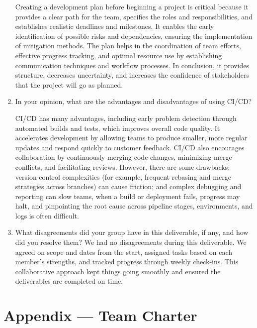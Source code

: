 \documentclass{article}
\begin{document}
\begin{enumerate}
	Creating a development plan before beginning a project is critical because it provides a clear path for the team, specifies the roles and 		responsibilities, and establishes realistic deadlines and milestones.  It enables the early identification of possible risks and dependencies, ensuring the implementation of mitigation methods.  The plan helps in the coordination of team efforts, effective progress tracking, and optimal resource use by establishing communication techniques and workflow processes.  In conclusion, it provides structure, decreases uncertainty, and increases the confidence of stakeholders that the project will go as planned.
	\item In your opinion, what are the advantages and disadvantages of using CI/CD?

    CI/CD has many advantages, including early problem detection through automated builds and tests, which improves overall code quality.  It  accelerates development by allowing teams to produce smaller, more regular updates and respond quickly to customer feedback.  CI/CD also encourages collaboration by continuously merging code changes, minimizing merge conflicts, and facilitating reviews.  However, there are some drawbacks: version-control complexities (for example, frequent rebasing and merge strategies across branches) can cause friction; and complex debugging and reporting can slow teams, when a build or deployment fails, progress may halt, and pinpointing the root cause across pipeline stages, environments, and logs is often difficult.   
	\item What disagreements did your group have in this deliverable, if any,
    and how did you resolve them?
    We had no disagreements during this deliverable.  We agreed on scope and dates from the start, assigned tasks based on each member's strengths, and tracked progress through weekly check-ins.  This collaborative approach kept things going smoothly and ensured the deliverables are completed on time.
\end{enumerate}
\newpage{}

\section*{Appendix --- Team Charter}

\end{document}
